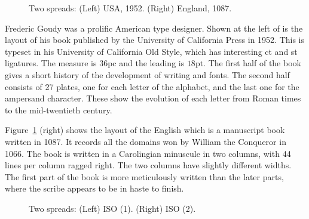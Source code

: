 \documentclass[10pt,letterpaper,extrafontsizes]{memoir}
\begin{document}
\begin{figure}
\centering
\begin{minipage}[b]{\pwlayi}
\end{minipage}
\hfill
\begin{minipage}[b]{\pwlayi}
\end{minipage}
\caption[Two spreads: USA, 1952 and England, 1087]%
        {Two spreads: (Left) USA, 1952.
         (Right) England, 1087.} \label{fb:11}
\end{figure}

    Frederic Goudy was a prolific American 
type designer. Shown at the left of
 is the layout of his book  published by the University of California Press in 1952.
This is typeset in his University of California Old 
Style, which has
interesting ct and st ligatures. The measure is $36$pc and the leading
is $18$pt. The first half of the book gives a short history of the development
of writing and fonts. The second half consists of 27 plates, one for each 
letter of the alphabet, and the last one for the ampersand character. These 
show the evolution of each letter from Roman times to the mid-twentieth
century.


    Figure~\ref{fb:11} (right) shows the layout of the English 
 which is a manuscript book written in 1087. 
It records all the domains won by William the Conqueror in 1066. 
The book is written in a Carolingian minuscule
in two columns, with 44 lines per column ragged right. 
The two columns have slightly different widths. The first part of the book 
is more meticulously written than the later parts, where the scribe appears 
to be in haste to finish.


\begin{figure}
\centering
\begin{minipage}[b]{\pwlayi}
\end{minipage}
\hfill
\begin{minipage}[b]{\pwlayi}
\end{minipage}
\caption[Two spreads for ISO page sizes]%
        {Two spreads: (Left) ISO (1).
         (Right) ISO (2).} \label{fb:12}
\end{figure}
\end{document}
